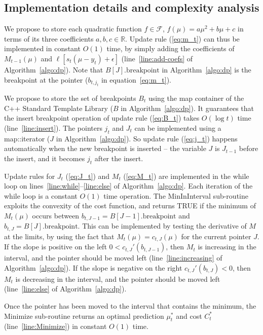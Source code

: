 \documentclass{article}
\begin{document}

\subsection{Implementation details and complexity analysis}

We propose to store each quadratic function $f\in\mathcal F$,
$f(\mu)=a\mu^2 + b\mu + c$ in terms of its three coefficients
$a,b,c\in\mathbb R$. Update rule (\ref{eq:m_t}) can thus be
implemented in constant $O(1)$ time, by simply adding the coefficients of
$M_{t-1}(\mu)$ and $\ell[s_t(\mu-y_t)+\epsilon]$
(line~\ref{line:add-coefs} of Algorithm~\ref{algo:dp}). Note that
$B[J].\text{breakpoint}$ in Algorithm~\ref{algo:dp} is the 
breakpoint at the pointer ($b_{t,j_t}$ in equation~\ref{eq:m_t}).

We propose to store the set of breakpoints $B_t$ using the map
container of the C++ Standard Template Library ($B$ in
Algorithm~\ref{algo:dp}). It guarantees that the insert breakpoint
operation of update rule (\ref{eq:B_t}) takes $O(\log t)$ time
(line~\ref{line:insert}). The pointers $j_t$ and $J_t$ can be implemented
using a map::iterator ($J$ in Algorithm~\ref{algo:dp}). So update rule
(\ref{eq:j_t}) happens automatically when the new breakpoint is
inserted -- the variable $J$ is $J_{t-1}$ before the insert, and it
becomes $j_t$ after the insert.

Update rules for $J_t$ (\ref{eq:J_t}) and $M_t$ (\ref{eq:M_t}) are
implemented in the while loop on
lines~\ref{line:while}--\ref{line:else} of
Algorithm~\ref{algo:dp}. Each iteration of the while loop is a
constant $O(1)$ time operation. The MinInInterval sub-routine exploits
the convexity of the cost function, and returns TRUE if the minimum of
$M_t(\mu)$ occurs between $b_{t,J-1}=B[J-1].\text{breakpoint}$ and
$b_{t,J}=B[J].\text{breakpoint}$. This can be implemented by testing
the derivative of $M$ at the limits, by using the fact that
$M_t(\mu)=c_{t,J}(\mu)$ for the current pointer $J$. If the slope is
positive on the left $0<c_{t,J}'(b_{t,J-1})$, then $M_t$ is increasing
in the interval, and the pointer should be moved left
(line~\ref{line:increasing} of Algorithm~\ref{algo:dp}). If the slope
is negative on the right $c_{t,J}'(b_{t,J})<0$, then $M_t$ is
decreasing in the interval, and the pointer should be moved left
(line~\ref{line:else} of Algorithm~\ref{algo:dp}).

Once the pointer has been moved to the interval that contains the
minimum, the Minimize sub-routine returns an optimal prediction
$\mu_t^*$ and cost $C_t^*$ (line~\ref{line:Minimize}) in constant
$O(1)$ time.
\end{document}
